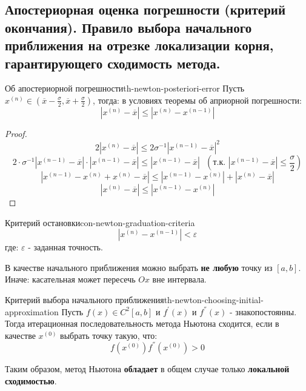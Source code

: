 \documentclass[14pt]{extarticle}
\begin{document}
\clearpage
\subsection{Апостериорная оценка погрешности (критерий окончания). Правило выбора начального приближения на отрезке локализации корня, гарантирующего сходимость метода.}

    \begin{theorem}{Об апостериорной погрешности}{th-newton-posteriori-error}
        Пусть $x^{(n)} \in (\overline{x} - \frac{\sigma}{2}, \overline{x} + \frac{\sigma}{2})$, тогда: в условиях теоремы об априорной погрешности:
        $$|x^{(n)} - \overline{x}| \leq |x^{(n)} - x^{(n - 1)}|$$
    
        \begin{proof}
            $$2|x^{(n)} - \overline{x}| \leq 2 \sigma^{-1} |x^{(n - 1)} - \overline{x}|^{2}$$
            $$2 \cdot \sigma^{-1} |x^{(n - 1)} - \overline{x}| \cdot |x^{(n - 1)} - \overline{x}| \leq |x^{(n-1)} - \overline{x}| \text{ } (\text{т.к. } |x^{(n - 1)} - \overline{x}| \leq \frac{\sigma}{2})$$
            $$|x^{(n-1)} - x^{(n)} + x^{(n)} - \overline{x}| \leq |x^{(n-1)} - x^{(n)}| + |x^{(n)} - \overline{x}|$$
            $$|x^{(n)} - \overline{x}| \leq |x^{(n-1)} - x^{(n)}|$$
        \end{proof}
    \end{theorem}

    \begin{consequence}{Критерий остановки}{con-newton-graduation-criteria}
        $$|x^{(n)} - x^{(n - 1)}| < \varepsilon$$
        где: $\varepsilon$ - заданная точность.
    \end{consequence}

    В качестве начального приближения можно выбрать \textbf{не любую} точку из $[a, b]$. Иначе: касательная может пересечь $Ox$ вне интервала.

    \begin{theorem}{Критерий выбора начального приближения}{th-newton-choosing-initial-approximation}
        Пусть $f(x) \in C^{2}[a, b]$ и $f^{'}(x)$ и $f^{''}(x)$ - знакопостоянны.\\
        Тогда итерационная последовательность метода Ньютона сходится, если в качестве $x^{(0)}$ выбрать точку такую, что:
        $$f(x^{(0)})f^{''}(x^{(0)}) > 0$$

        Таким образом, метод Ньютона \textbf{обладает} в общем случае только \textbf{локальной сходимостью}.
    \end{theorem}
\end{document}
